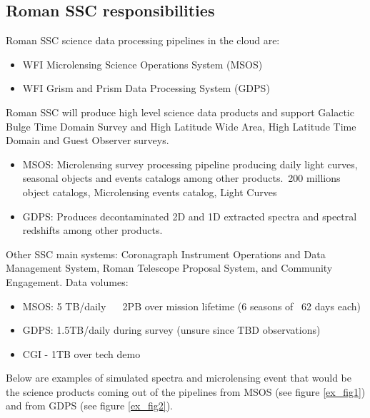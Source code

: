 \documentclass[11pt,twoside]{article}
\begin{document}
\subsection{Roman SSC responsibilities}

Roman SSC science data processing pipelines in the cloud are:
\begin{itemize}
\item WFI Microlensing Science Operations System (MSOS)
\item WFI Grism and Prism Data Processing System (GDPS)
\end{itemize}

Roman SSC will produce high level science data products and support Galactic Bulge Time Domain Survey and High Latitude Wide Area, High Latitude Time Domain and Guest Observer surveys.

\begin{itemize}
\item MSOS: Microlensing survey processing pipeline producing daily light curves, seasonal objects and events catalogs among other products.~200 millions object catalogs, Microlensing events catalog, Light Curves
\item GDPS: Produces decontaminated 2D and 1D extracted spectra and spectral redshifts among other products. 
\end{itemize}


Other SSC main systems: Coronagraph Instrument Operations and Data Management System, Roman Telescope Proposal System, and Community Engagement.
Data volumes:

\begin{itemize}
  \item MSOS: 5 TB/daily  ~ 2PB over mission lifetime (6 seasons of ~62 days each) 
  \item GDPS: 1.5TB/daily during survey (unsure since TBD observations)
  \item CGI - 1TB over tech demo
\end{itemize}

Below are examples of simulated spectra and microlensing event that would be the science products coming out of the pipelines from MSOS (see figure \ref{ex_fig1}) and from GDPS (see figure \ref{ex_fig2}).


\end{document}
